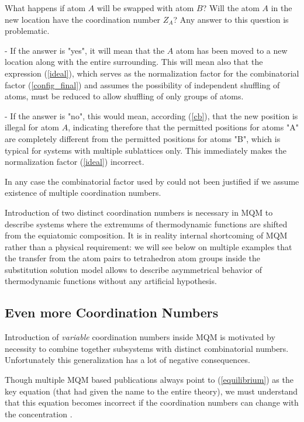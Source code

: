 \documentclass[12pt,abstract]{scrartcl}
\begin{document}
What happens if atom $A$ will be swapped with atom $B$? Will the atom $A$  in the new location have the coordination number $Z_A$? Any answer to this question is problematic.

- If the answer is "yes", it will mean that the $A$ atom has been moved to a new location along with the entire surrounding.
This will  mean also that the expression (\ref{ideal}), which serves as the normalization factor for the combinatorial factor (\ref{config_final}) and assumes the possibility of independent shuffling of atoms, must be reduced to allow shuffling of only groups of atoms.

- If the answer is "no", this would mean, according (\ref{cb}), that the new position is illegal for atom $A$, indicating therefore that the permitted  positions for atoms "A" are completely different from the permitted  positions for atoms "B", which is typical for systems with multiple sublattices only. This immediately makes the normalization factor (\ref{ideal}) incorrect.



In any case the  combinatorial  factor used by \cite{Pelton_p1} could not been justified if we assume existence of multiple coordination numbers.


Introduction of two distinct coordination numbers is necessary in MQM to describe systems where the extremums of thermodynamic functions are shifted from the equiatomic composition. It is in reality internal shortcoming of MQM rather than a physical requirement: we will see  below on multiple examples that the transfer from the atom pairs  to tetrahedron  atom groups inside the substitution solution model allows to describe asymmetrical behavior of thermodynamic functions without any artificial hypothesis.

\subsection{Even more Coordination Numbers}

Introduction of \textit{variable} coordination numbers inside MQM  is motivated by necessity to combine together subsystems with distinct  combinatorial  numbers. Unfortunately this generalization has a lot of negative consequences.

Though multiple MQM based publications always point to (\ref{equilibrium})  as the key equation (that  had given the name to the entire theory), we must understand that this equation becomes incorrect if the coordination numbers can change with the concentration \cite{Saulov2007}.
\end{document}
